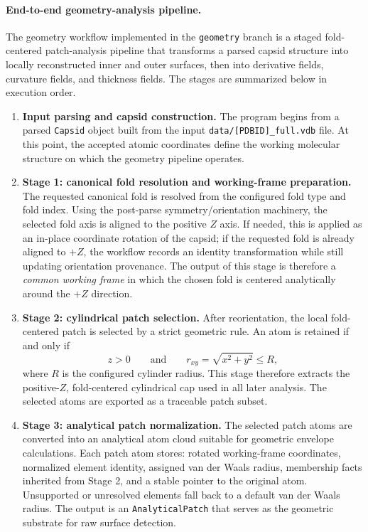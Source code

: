 \paragraph{End-to-end geometry-analysis pipeline.}
The geometry workflow implemented in the \texttt{geometry} branch is a staged fold-centered patch-analysis pipeline that transforms a parsed capsid structure into locally reconstructed inner and outer surfaces, then into derivative fields, curvature fields, and thickness fields. The stages are summarized below in execution order.

\begin{enumerate}
  \item \textbf{Input parsing and capsid construction.}  
  The program begins from a parsed \texttt{Capsid} object built from the input \texttt{data/[PDBID]\_full.vdb} file. At this point, the accepted atomic coordinates define the working molecular structure on which the geometry pipeline operates.

  \item \textbf{Stage 1: canonical fold resolution and working-frame preparation.}  
  The requested canonical fold is resolved from the configured fold type and fold index. Using the post-parse symmetry/orientation machinery, the selected fold axis is aligned to the positive \(Z\) axis. If needed, this is applied as an in-place coordinate rotation of the capsid; if the requested fold is already aligned to \(+Z\), the workflow records an identity transformation while still updating orientation provenance. The output of this stage is therefore a \emph{common working frame} in which the chosen fold is centered analytically around the \(+Z\) direction.

  \item \textbf{Stage 2: cylindrical patch selection.}  
  After reorientation, the local fold-centered patch is selected by a strict geometric rule. An atom is retained if and only if
  \[
    z > 0
    \qquad\text{and}\qquad
    r_{xy} = \sqrt{x^2+y^2} \le R ,
  \]
  where \(R\) is the configured cylinder radius. This stage therefore extracts the positive-\(Z\), fold-centered cylindrical cap used in all later analysis. The selected atoms are exported as a traceable patch subset.

  \item \textbf{Stage 3: analytical patch normalization.}  
  The selected patch atoms are converted into an analytical atom cloud suitable for geometric envelope calculations. Each patch atom stores: rotated working-frame coordinates, normalized element identity, assigned van der Waals radius, membership facts inherited from Stage 2, and a stable pointer to the original atom. Unsupported or unresolved elements fall back to a default van der Waals radius. The output is an \texttt{AnalyticalPatch} that serves as the geometric substrate for raw surface detection.


\end{enumerate}
